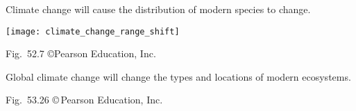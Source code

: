 \documentclass[t]{beamer}
\begin{document}
%
\begin{frame}[t]{Climate change will cause the distribution of modern species to change.}

	\texttt{[image: climate\_change\_range\_shift]}
	
	\vfilll
	
	\hfill \tiny Fig.~52.7 \copyright Pearson Education, Inc.

\end{frame}
%
{
\begin{frame}[b]{Global climate change will change the types and locations of modern ecosystems.}

	\hfill \tiny Fig.~53.26 \copyright\,Pearson Education, Inc.
\end{frame}
}
%

\end{document}
